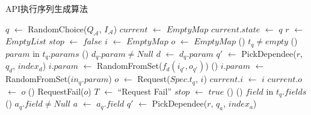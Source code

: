         \begin{algorithm}
          	\scriptsize
          	
            \caption{API执行序列生成算法}
          	
            $q$ $\gets$ RandomChoice($Q_{\mathcal{A}}$, $I_{\mathcal{A}}$)\;
            $current$ $\gets$ $EmptyMap$\;
            $current.state$ $\gets$ $q$\;
            $r$ $\gets$ $EmptyList$\;
            $stop$ $\gets$ $false$\;
             {
            	$i$ $\gets$ $EmptyMap$\;
                $o$ $\gets$ $EmptyMap$\;
            	\If() {$t_q \neq empty$}{
                	\ForEach() {$param$ in $t_q.params$} {
                    	\If() {$d_q.param \neq Null$} {
                        	$d$ $\gets$ $d_q.param$\;
                            $q'$ $\gets$ PickDependee($r$, $q_d$, $index_d$)\;
                            $i.param$ $\gets$ RandomFromSet($f_d(i_{q'}, o_{q'})$)\;
                        } \Else() {
                        	$i.param$ $\gets$ RandomFromSet($in_q.param$)\;
                        }
                    }
                    $o$ $\gets$ Request($Spec.t_q$, $i$)\;
                    $current.i$ $\gets$ $i$\;
                    $current.o$ $\gets$ $o$\;
                    \If() {RequestFail($o$)} {
                    	$T$ $\gets$ ``Request Fail''\;
                        $stop$ $\gets$ $true$\;
                    } \Else() {
                    	\ForEach() {$field$ in $t_q.fields$} {
                        	\If() {$a_q.field \neq Null$} {
                            	$a$ $\gets$ $a_q.field$\;
                                $q'$ $\gets$ PickDependee($r$, $q_a$, $index_a$)\;
                                 {
}}}}}}
\end{algorithm}
